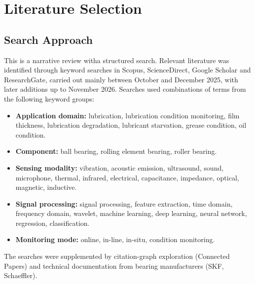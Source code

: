
\section{Literature Selection}
\label{sec:search}

\subsection{Search Approach}
This is a narrative review witha  structured search. Relevant literature was identified through keyword searches in Scopus, ScienceDirect, Google Scholar and ResearchGate, carried out mainly between October and December 2025, with later additions up to November 2026. Searches used combinations of terms from the following keyword groups:

\begin{itemize}
  \item \textbf{Application domain:} lubrication, lubrication condition monitoring, film thickness, lubrication degradation, lubricant starvation, grease condition, oil condition.
  \item \textbf{Component:} ball bearing, rolling element bearing, roller bearing.
  \item \textbf{Sensing modality:} vibration, acoustic emission, ultrasound, sound, microphone, thermal, infrared, electrical, capacitance, impedance, optical, magnetic, inductive.
  \item \textbf{Signal processing:} signal processing, feature extraction, time domain, frequency domain, wavelet, machine learning, deep learning, neural network, regression, classification.
  \item \textbf{Monitoring mode:} online, in-line, in-situ, condition monitoring.
\end{itemize}

The searches were supplemented by citation-graph exploration (Connected Papers) and technical documentation from bearing manufacturers (SKF, Schaeffler).

